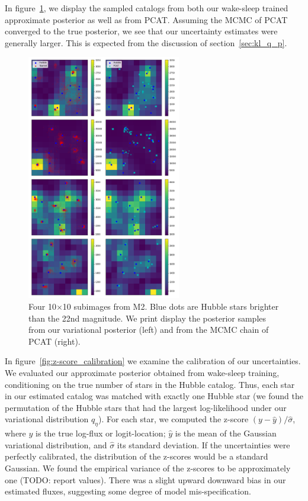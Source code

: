 In figure~\ref{fig:example_subimages_sampled}, we display the sampled catalogs from both our 
wake-sleep trained approximate posterior as well as from PCAT. Assuming the MCMC
of PCAT converged to the true posterior, we see that our uncertainty estimates
were generally larger. This is expected from the discussion of section~\ref{sec:kl_q_p}. 

\begin{figure}[h]
    \centering
    \includegraphics[width=0.6\textwidth]{figures/example_subimages_samples.png}
    \caption{Four 10$\times$10 subimages from
    M2. Blue dots are Hubble stars brighter than the 22nd magnitude.
    We print display the posterior samples from our variational
    posterior (left) and from the MCMC chain of PCAT (right). }
    \label{fig:example_subimages_sampled}
\end{figure}

In figure~\ref{fig:z-score_calibration} we examine the calibration of our uncertainties. We evaluated our approximate posterior obtained from wake-sleep training, conditioning on the true number of stars in the Hubble catalog. Thus, each star in our estimated 
catalog was matched with exactly one Hubble star (we found the permutation of the Hubble stars that had the largest log-likelihood under our variational distribution $q_\eta$). For each star, we computed the z-score $(y - \hat y) / \hat \sigma$, where $y$ is the true log-flux or 
logit-location; $\hat y$ is the mean of the Gaussian variational distribution, and $\hat\sigma$  its standard deviation. If the uncertainties were perfectly calibrated, the distribution of the 
z-scores would be a standard Gaussian. We found the empirical variance of the z-scores
to be approximately one (TODO: report values). There was a slight upward downward bias in our estimated fluxes, suggesting some degree of model mis-specification. 

